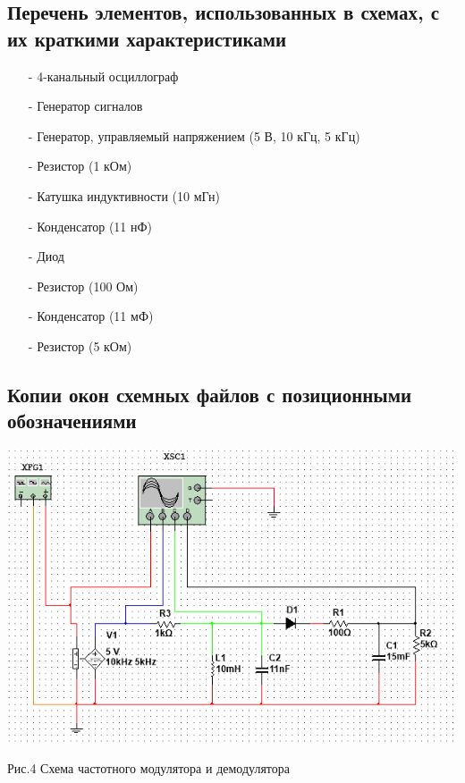 \documentclass[11pt]{article}
\begin{document}
\subsection{Перечень элементов, использованных в схемах, с
их краткими характеристиками}
\begin{itemize}
    \item[-] 4-канальный осциллограф
    \item[-] Генератор сигналов
    \item[-] Генератор, управляемый напряжением (5 В, 10 кГц, 5 кГц)
    \item[-] Резистор (1 кОм)
    \item[-] Катушка индуктивности (10 мГн)
    \item[-] Конденсатор (11 нФ)
    \item[-] Диод
    \item[-] Резистор (100 Ом)
    \item[-] Конденсатор (11 мФ)
    \item[-] Резистор (5 кОм)
\end{itemize}

\subsection{Копии окон схемных файлов с позиционными обозначениями}
\includegraphics[width=1\linewidth]{img/scheme2.png}
\begin{center}
    Рис.4 Схема частотного модулятора и демодулятора
\end{center}
\end{document}
